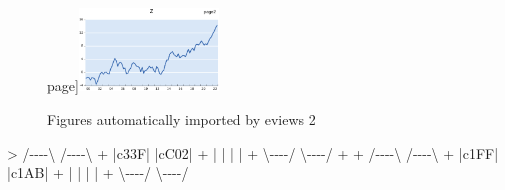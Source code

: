 \documentclass[
]{article}
\newenvironment{Shaded}{\begin{snugshade}}{\end{snugshade}}
\newcommand{\NormalTok}[1]{#1}
\begin{document}
\begin{figure}[h]
page\label{fig:biscuit-6}]{\includegraphics[width=0.33\textwidth,height=0.25\textwidth]{eviews_graphs_files/figure-latex//biscuit-page2-graph3} }\caption{Figures automatically imported by eviews 2}\label{fig:biscuit}
\end{figure}

\begin{Shaded}
\begin{Highlighting}[]
\NormalTok{\textgreater{} /{-}{-}{-}{-}\textbackslash{} /{-}{-}{-}{-}\textbackslash{}}
\NormalTok{+ |c33F| |cC02|}
\NormalTok{+ |    | |    |}
\NormalTok{+ \textbackslash{}{-}{-}{-}{-}/ \textbackslash{}{-}{-}{-}{-}/}
\NormalTok{+ }
\NormalTok{+ /{-}{-}{-}{-}\textbackslash{} /{-}{-}{-}{-}\textbackslash{}}
\NormalTok{+ |c1FF| |c1AB|}
\NormalTok{+ |    | |    |}
\NormalTok{+ \textbackslash{}{-}{-}{-}{-}/ \textbackslash{}{-}{-}{-}{-}/}
\end{Highlighting}
\end{Shaded}
\end{document}
